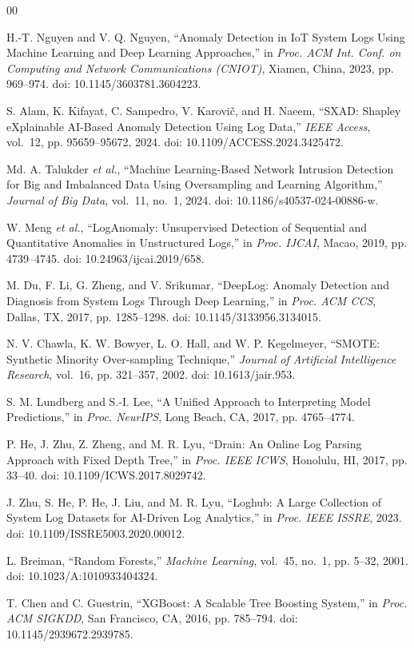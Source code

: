 \documentclass[conference]{IEEEtran}
\begin{document}
\begin{thebibliography}{00}

H.-T. Nguyen and V. Q. Nguyen,
``Anomaly Detection in IoT System Logs Using Machine Learning and Deep
Learning Approaches,''
in \textit{Proc. ACM Int. Conf. on Computing and Network Communications
(CNIOT)}, Xiamen, China, 2023, pp. 969--974.
doi: 10.1145/3603781.3604223.

S. Alam, K. Kifayat, C. Sampedro, V. Karovi\v{c}, and H. Naeem,
``SXAD: Shapley eXplainable AI-Based Anomaly Detection Using Log Data,''
\textit{IEEE Access}, vol.~12, pp. 95659--95672, 2024.
doi: 10.1109/ACCESS.2024.3425472.

Md. A. Talukder \textit{et al.},
``Machine Learning-Based Network Intrusion Detection for Big and Imbalanced
Data Using Oversampling and Learning Algorithm,''
\textit{Journal of Big Data}, vol.~11, no.~1, 2024.
doi: 10.1186/s40537-024-00886-w.

W. Meng \textit{et al.},
``LogAnomaly: Unsupervised Detection of Sequential and Quantitative
Anomalies in Unstructured Logs,''
in \textit{Proc. IJCAI}, Macao, 2019, pp. 4739--4745.
doi: 10.24963/ijcai.2019/658.

M. Du, F. Li, G. Zheng, and V. Srikumar,
``DeepLog: Anomaly Detection and Diagnosis from System Logs Through Deep
Learning,''
in \textit{Proc. ACM CCS}, Dallas, TX, 2017, pp. 1285--1298.
doi: 10.1145/3133956.3134015.

N. V. Chawla, K. W. Bowyer, L. O. Hall, and W. P. Kegelmeyer,
``SMOTE: Synthetic Minority Over-sampling Technique,''
\textit{Journal of Artificial Intelligence Research}, vol.~16, pp. 321--357,
2002.
doi: 10.1613/jair.953.

S. M. Lundberg and S.-I. Lee,
``A Unified Approach to Interpreting Model Predictions,''
in \textit{Proc. NeurIPS}, Long Beach, CA, 2017, pp. 4765--4774.

P. He, J. Zhu, Z. Zheng, and M. R. Lyu,
``Drain: An Online Log Parsing Approach with Fixed Depth Tree,''
in \textit{Proc. IEEE ICWS}, Honolulu, HI, 2017, pp. 33--40.
doi: 10.1109/ICWS.2017.8029742.

J. Zhu, S. He, P. He, J. Liu, and M. R. Lyu,
``Loghub: A Large Collection of System Log Datasets for AI-Driven Log
Analytics,''
in \textit{Proc. IEEE ISSRE}, 2023.
doi: 10.1109/ISSRE5003.2020.00012.

L. Breiman,
``Random Forests,''
\textit{Machine Learning}, vol.~45, no.~1, pp. 5--32, 2001.
doi: 10.1023/A:1010933404324.

T. Chen and C. Guestrin,
``XGBoost: A Scalable Tree Boosting System,''
in \textit{Proc. ACM SIGKDD}, San Francisco, CA, 2016, pp. 785--794.
doi: 10.1145/2939672.2939785.

\end{thebibliography}

\balance
\end{document}
